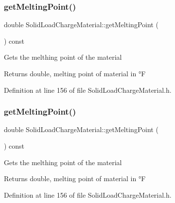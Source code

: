 \subsubsection{\texorpdfstring{get\+Melting\+Point()}{getMeltingPoint()}\hspace{0.1cm}{\footnotesize\ttfamily [1/3]}}
{\footnotesize\ttfamily double Solid\+Load\+Charge\+Material\+::get\+Melting\+Point (\begin{DoxyParamCaption}{ }\end{DoxyParamCaption}) const\hspace{0.3cm}{\ttfamily [inline]}}

Gets the melthing point of the material \begin{DoxyReturn}{Returns}
double, melting point of material in °F 
\end{DoxyReturn}


Definition at line 156 of file Solid\+Load\+Charge\+Material.\+h.

\mbox{\label{class_solid_load_charge_material_a4be001f6e6ecbd2ad0ae1d154559cdb0}} 
\subsubsection{\texorpdfstring{get\+Melting\+Point()}{getMeltingPoint()}\hspace{0.1cm}{\footnotesize\ttfamily [2/3]}}
{\footnotesize\ttfamily double Solid\+Load\+Charge\+Material\+::get\+Melting\+Point (\begin{DoxyParamCaption}{ }\end{DoxyParamCaption}) const\hspace{0.3cm}{\ttfamily [inline]}}

Gets the melthing point of the material \begin{DoxyReturn}{Returns}
double, melting point of material in °F 
\end{DoxyReturn}


Definition at line 156 of file Solid\+Load\+Charge\+Material.\+h.

\mbox{\label{class_solid_load_charge_material_a4be001f6e6ecbd2ad0ae1d154559cdb0}} 

